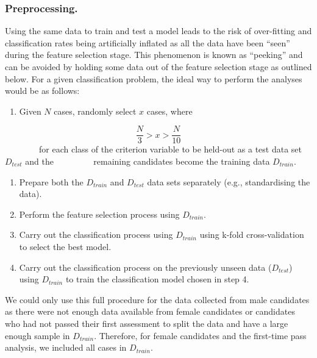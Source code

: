\documentclass[
  12pt,
  a4paper,
]{book}
\providecommand{\tightlist}{%
  \setlength{\itemsep}{0pt}\setlength{\parskip}{0pt}}
\begin{document}
\hypertarget{preprocessing.}{%
\subsubsection{Preprocessing.}\label{preprocessing.}}

Using the same data to train and test a model leads to the risk of over-fitting and classification rates being artificially inflated as all the data have been ``seen'' during the feature selection stage. This phenomenon is known as ``peeking'' \citep{Kuncheva2018, Reunanen2003a, Smialowski2010} and can be avoided by holding some data out of the feature selection stage as outlined below. For a given classification problem, the ideal way to perform the analyses would be as follows:

\begin{enumerate}
\def\labelenumi{\arabic{enumi}.}
\tightlist
\item
  Given \(N\) cases, randomly select \(x\) cases, where
\end{enumerate}

\[\frac{N}{3} > x > \frac{N}{10}\]
~~~~~~~~for each class of the criterion variable to be held-out as a test data set \(D_{test}\) and the ~~~~~~~~ remaining candidates become the training data \(D_{train}\).

\begin{enumerate}
\def\labelenumi{\arabic{enumi}.}
\setcounter{enumi}{1}
\tightlist
\item
  Prepare both the \(D_{train}\) and \(D_{test}\) data sets separately (e.g., standardising the data).
\item
  Perform the feature selection process using \(D_{train}\).
\item
  Carry out the classification process using \(D_{train}\) using k-fold cross-validation to select the best model.
\item
  Carry out the classification process on the previously unseen data (\(D_{test}\)) using \(D_{train}\) to train the classification model chosen in step 4.
\end{enumerate}

We could only use this full procedure for the data collected from male candidates as there were not enough data available from female candidates or candidates who had not passed their first assessment to split the data and have a large enough sample in \(D_{train}\). Therefore, for female candidates and the first-time pass analysis, we included all cases in \(D_{train}\).
\end{document}
